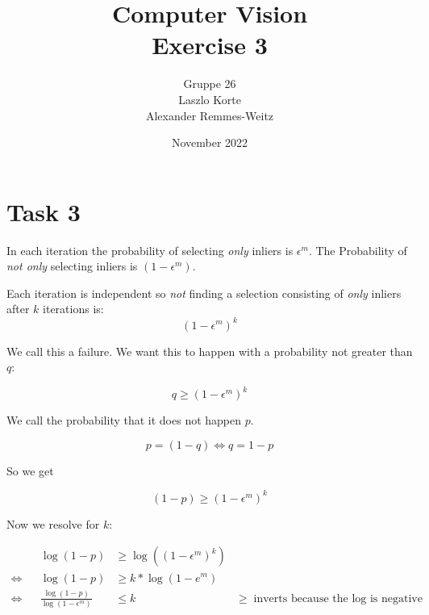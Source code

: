 \documentclass{article}
\title{Computer Vision\\Exercise 3}
\author{Gruppe 26\\Laszlo Korte\\Alexander Remmes-Weitz
}
\date{November 2022}
\begin{document}
\maketitle

\section*{Task 3}

In each iteration the probability of selecting \textit{only} inliers is $\epsilon^m$. The Probability of \textit{not only} selecting inliers is $(1-\epsilon^m)$.

Each iteration is independent so \textit{not} finding a selection consisting of \textit{only} inliers after $k$ iterations is: $$(1-\epsilon^m)^k$$

We call this a failure. We want this to happen with a probability not greater than $q$:

$$q \ge (1-\epsilon^m)^k$$

We call the probability that it does not happen $p$. 

$$p = (1-q) \iff q = 1-p$$

So we get

$$(1-p) \ge (1-\epsilon^m)^k$$

Now we resolve for $k$:

\begin{align*}
 & &\log(1-p) &\ge \log((1-\epsilon^m)^k) \\
\iff && \log(1-p) &\ge k * \log(1-e^m) \\
\iff && \frac{\log(1-p)}{\log(1-\epsilon^m)} &\le k  & \ge \text{inverts because the $\log$ is negative}
\end{align*}
\end{document}
